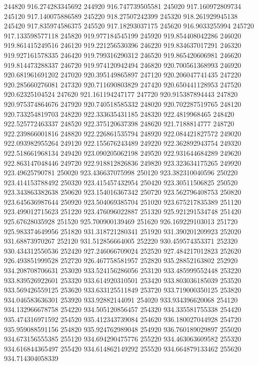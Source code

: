 {244820 916.274283345692
244920 916.747739505581
245020 917.160972809734
245120 917.140075886589
245220 918.27507242399
245320 918.261929945138
245420 917.835974586375
245520 917.18293037175
245620 916.9033255994
245720 917.133598577118
245820 919.977184545199
245920 919.854408042286
246020 919.861415249516
246120 919.221256530396
246220 919.834637017291
246320 919.927161578335
246420 919.799316290312
246520 919.865420606981
246620 919.814473288337
246720 919.974120942494
246820 920.700561368993
246920 920.681961691202
247020 920.395149865897
247120 920.206047741435
247220 920.285660276081
247320 920.711690803829
247420 920.650441128953
247520 920.62325104524
247620 921.161194247177
247720 920.915387894443
247820 920.975374864676
247920 920.740518585332
248020 920.702287519765
248120 920.733254819703
248220 922.333635431185
248320 922.4819968465
248420 922.525772463337
248520 922.375120637398
248620 921.7188814777
248720 922.239866001816
248820 922.226861535794
248920 922.084421827572
249020 922.093982955264
249120 922.155676243489
249220 922.362892943754
249320 922.518661968134
249420 923.090205062198
249520 922.931644684289
249620 922.863147048446
249720 922.918812826836
249820 923.323634175265
249920 923.49625790781
250020 923.436637075998
250120 923.382310040596
250220 923.414153788492
250320 923.415457432954
250420 923.30511506825
250520 923.343863382638
250620 923.154016367342
250720 923.562796408753
250820 923.645636987644
250920 923.504069385704
251020 923.675217835389
251120 923.499012715623
251220 923.476096022887
251320 925.921291534748
251420 925.67628035928
251520 925.700900139469
251620 926.169229103013
251720 925.983374649956
251820 931.318721280341
251920 931.390201209923
252020 931.68873970267
252120 931.512856664005
252220 930.459574353371
252320 930.434312550536
252420 927.246066709024
252520 927.484217012823
252620 926.493851999528
252720 926.467758581957
252820 935.28852163802
252920 934.208708706631
253020 933.524156286056
253120 933.485999552448
253220 933.839526922601
253320 933.614920310501
253420 933.803036185039
253520 933.569426559125
253620 933.633125511849
253720 933.719000350125
253820 934.046583636301
253920 933.92882144091
254020 933.934396620068
254120 934.132966678758
254220 934.505120856457
254320 934.335581755338
254420 935.474316971592
254520 935.412343739084
254620 936.180027044928
254720 935.959088591156
254820 935.924762989048
254920 936.760189029897
255020 934.673156555385
255120 934.694290475776
255220 934.463063609582
255320 934.616844365497
255420 934.614862149292
255520 934.664879133462
255620 934.714304058339
}
